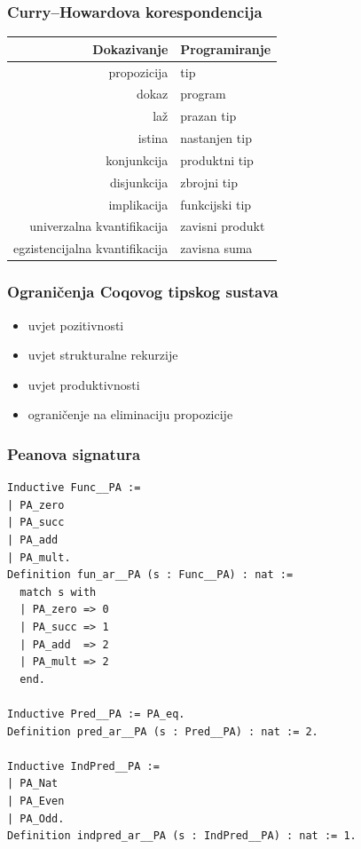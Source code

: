 \documentclass{beamer}
\begin{document}
\begin{frame}
  \frametitle{Curry--Howardova korespondencija}
  \begin{center}
    \begin{tabular}[!htb]{rl}
      \toprule
      Dokazivanje & Programiranje \\
      \midrule
      propozicija & tip \\
      dokaz & program \\
      laž & prazan tip \\
      istina & nastanjen tip \\    
      konjunkcija & produktni tip \\
      disjunkcija & zbrojni tip \\
      implikacija & funkcijski tip \\
      univerzalna kvantifikacija & zavisni produkt \\
      egzistencijalna kvantifikacija & zavisna suma \\
      \bottomrule
    \end{tabular}
  \end{center}
\end{frame}\addtocounter{framenumber}{-1}

\begin{frame}
  \frametitle{Ograničenja Coqovog tipskog sustava}
  \begin{itemize}
  \item uvjet pozitivnosti
  \item uvjet strukturalne rekurzije
  \item uvjet produktivnosti
  \item ograničenje na eliminaciju propozicije
  \end{itemize}
\end{frame}\addtocounter{framenumber}{-1}

\begin{frame}[fragile]
  \frametitle{Peanova signatura}
  \begin{scriptsize}
\begin{verbatim}
Inductive Func__PA :=
| PA_zero
| PA_succ
| PA_add
| PA_mult.
Definition fun_ar__PA (s : Func__PA) : nat :=
  match s with
  | PA_zero => 0
  | PA_succ => 1
  | PA_add  => 2
  | PA_mult => 2
  end.

Inductive Pred__PA := PA_eq.
Definition pred_ar__PA (s : Pred__PA) : nat := 2.

Inductive IndPred__PA :=
| PA_Nat
| PA_Even
| PA_Odd.
Definition indpred_ar__PA (s : IndPred__PA) : nat := 1.
\end{verbatim}
  \end{scriptsize}
\end{frame}
\addtocounter{framenumber}{-1}
\end{document}
